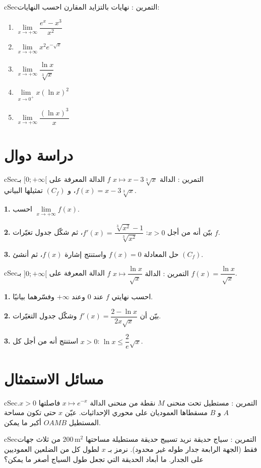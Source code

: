 \documentclass[12pt,a4paper]{article}
\newenvironment{BOX}[2]{\begin{otherlanguage}{english}\begin{arbox}{#1}{#2}}{\end{arbox}\end{otherlanguage}}
\newcounter{exo}
\newenvironment{tamrin}[1]{\stepcounter{exo}\begin{BOX}{cSec}{التمرين \theexo: #1}}{\end{BOX}}
\newcommand{\QQ}[1]{\par\smallskip\textbf{#1.} }
\begin{document}
\begin{tamrin}{نهايات بالتزايد المقارن}
احسب النهايات:
\begin{enumerate}[label=(\arabic*)]
\item $\lim\limits_{x\to+\infty}\dfrac{e^{x}-x^{3}}{x^{2}}$
\item $\lim\limits_{x\to+\infty}x^{2}e^{-\sqrt{x}}$
\item $\lim\limits_{x\to+\infty}\dfrac{\ln x}{\sqrt[3]{x}}$
\item $\lim\limits_{x\to0^{+}}x\left(\ln x\right)^{2}$
\item $\lim\limits_{x\to+\infty}\dfrac{\left(\ln x\right)^{3}}{x}$
\end{enumerate}
\end{tamrin}

\section{دراسة دوال}
\begin{tamrin}{الدالة $x\mapsto x-3\sqrt[3]{x}$}
$f$ الدالة المعرفة على $[0;+\infty[$ بـ $f(x)=x-3\sqrt[3]{x}$، و $(C_f)$ تمثيلها البياني.
\QQ{1} احسب $\lim\limits_{x\to+\infty}f(x)$.
\QQ{2} بيّن أنه من أجل $x>0$: $f'(x)=\dfrac{\sqrt[3]{x^{2}}-1}{\sqrt[3]{x^{2}}}$، ثم شكّل جدول تغيّرات $f$.
\QQ{3} حل المعادلة $f(x)=0$ واستنتج إشارة $f(x)$، ثم أنشئ $(C_f)$.
\end{tamrin}

\begin{tamrin}{الدالة $x\mapsto\dfrac{\ln x}{\sqrt{x}}$}
$f$ الدالة المعرفة على $]0;+\infty[$ بـ $f(x)=\dfrac{\ln x}{\sqrt{x}}$.
\QQ{1} احسب نهايتي $f$ عند $0$ وعند $+\infty$ وفسّرهما بيانيًا.
\QQ{2} بيّن أن $f'(x)=\dfrac{2-\ln x}{2x\sqrt{x}}$ وشكّل جدول التغيّرات.
\QQ{3} استنتج أنه من أجل كل $x>0$: $\ln x\leqslant\dfrac{2}{e}\sqrt{x}$.
\end{tamrin}

\section{مسائل الاستمثال}
\begin{tamrin}{مستطيل تحت منحنى}
$M$ نقطة من منحنى الدالة $x\mapsto e^{-x}$ فاصلتها $x>0$. $A$ و $B$ مسقطاها العموديان على محوري الإحداثيات. عيّن $x$ حتى تكون مساحة المستطيل $OAMB$ أكبر ما يمكن.
\end{tamrin}

\begin{tamrin}{سياج حديقة}
نريد تسييج حديقة مستطيلة مساحتها $200\,\text{m}^{2}$ من ثلاث جهات فقط (الجهة الرابعة جدار طوله غير محدود). نرمز بـ $x$ لطول كل من الضلعين العموديين على الجدار. ما أبعاد الحديقة التي تجعل طول السياج أصغر ما يمكن؟
\end{tamrin}
\end{document}
